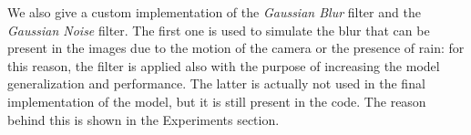 We also give a custom implementation of the \textit{Gaussian Blur} filter and the \textit{Gaussian Noise} filter. The first one is used to simulate the blur that can be present in the images due to the motion of the camera or the presence of rain: for this reason, the filter is applied also with the purpose of increasing the model generalization and performance. 
The latter is actually not used in the final implementation of the model, but it is still present in the code. The reason behind this is shown in the Experiments section.


